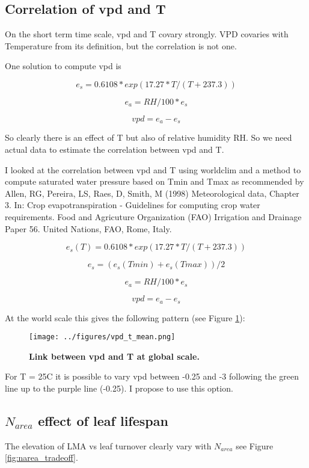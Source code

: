\documentclass[a4paper,11pt]{article}
\begin{document}
\pagebreak

\subsection{Correlation of vpd and T}

On the short term time scale, vpd and T covary strongly. VPD covaries with Temperature from its definition, but the correlation is not one.

One solution to compute vpd is

$$e_s = 0.6108 * exp(17.27 * T / (T + 237.3))$$

$$e_a = RH / 100 * e_s $$

$$vpd = e_a - e_s$$

So clearly there is an effect of T but also of relative humidity RH.
So we need actual data to estimate the correlation between vpd and T.

I looked at the correlation between vpd and T using worldclim and a method to compute saturated water pressure based on Tmin and Tmax as recommended by
Allen, RG, Pereira, LS, Raes, D, Smith, M (1998) Meteorological data, Chapter 3. In: Crop evapotranspiration - Guidelines for computing crop water requirements. Food and Agricuture Organization (FAO) Irrigation and Drainage Paper 56. United Nations, FAO, Rome, Italy. 

$$e_s(T) = 0.6108 * exp(17.27 * T / (T + 237.3))$$

$$e_s = (e_s(Tmin)+e_s(Tmax))/2 $$

$$e_a = RH / 100 * e_s $$

$$vpd = e_a - e_s$$

At the world scale this gives the following pattern (see Figure \ref{fig:vpd_t}):
\begin{figure}[ht]
\centering
\texttt{[image: ../figures/vpd\_t\_mean.png]}
\caption{\textbf{Link between vpd and T at global scale.}
\label{fig:vpd_t}}
\end{figure}

 For T = 25C it is possible to vary vpd between -0.25 and -3 following the green line up to the purple line (-0.25). I propose to use this option.
 
\pagebreak
 
 \subsection{$N_{area}$ effect of leaf lifespan}

The elevation of LMA vs leaf turnover clearly vary with $N_{area}$ see Figure \ref{fig:narea_tradeoff}. 
\end{document}
